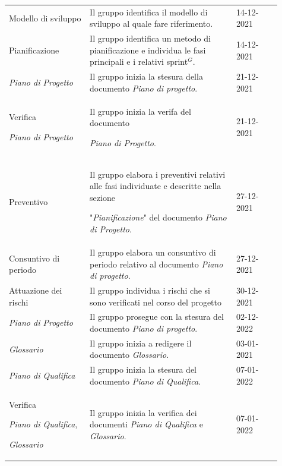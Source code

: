 {\begin{longtable}{p{0.27\linewidth}p{0.49\linewidth}p{0.15\linewidth}}
    \rowcolor[RGB]{216, 235, 171}
    Modello di sviluppo & Il gruppo identifica il modello di sviluppo al quale fare riferimento. & 14-12-2021\\

    \rowcolor[RGB]{233, 245, 206}
    Pianificazione & Il gruppo identifica un metodo di pianificazione e individua le fasi principali e i relativi sprint$^{G}$. & 14-12-2021\\

    \rowcolor[RGB]{216, 235, 171}
    \textit{Piano di Progetto} & Il gruppo inizia la stesura della documento \textit{Piano di progetto}. & 21-12-2021\\

    \rowcolor[RGB]{233, 245, 206}
    Verifica \par \textit{Piano di Progetto} & Il gruppo inizia la verifa del documento \par \textit{Piano di Progetto}. & 21-12-2021\\

    \rowcolor[RGB]{216, 235, 171}
    Preventivo & Il gruppo elabora i preventivi relativi alle fasi individuate e descritte nella sezione \par "\textit{Pianificazione}" del documento \textit{Piano di Progetto}. & 27-12-2021\\

    \rowcolor[RGB]{233, 245, 206}
    Consuntivo di periodo & Il gruppo elabora un consuntivo di periodo relativo al documento \textit{Piano di progetto}. & 27-12-2021\\

    \rowcolor[RGB]{216, 235, 171}
    Attuazione dei rischi & Il gruppo individua i rischi che si sono verificati nel corso del progetto & 30-12-2021\\

    \rowcolor[RGB]{233, 245, 206}
    \textit{Piano di Progetto} & Il gruppo prosegue con la stesura del documento \textit{Piano di progetto}. & 02-12-2022\\
    
    \rowcolor[RGB]{216, 235, 171}
    \textit{Glossario} & Il gruppo inizia a redigere il documento \textit{Glossario}. & 03-01-2021\\

    \rowcolor[RGB]{233, 245, 206}
    \textit{Piano di Qualifica} & Il gruppo inizia la stesura del documento \textit{Piano di Qualifica}. & 07-01-2022\\

    \rowcolor[RGB]{216, 235, 171}
    Verifica \par \textit{Piano di Qualifica,} \par \textit{Glossario} & Il gruppo inizia la verifica dei documenti \textit{Piano di Qualifica} e \textit{Glossario}. & 07-01-2022\\


\end{longtable}}
